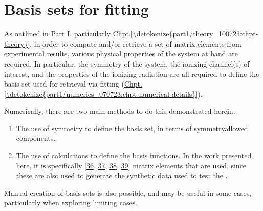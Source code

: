 \documentclass[letterpaper,table,10pt,english]{jupyterBook}
\begin{document}
\sphinxstepscope


\chapter{Basis sets for fitting}
\label{\detokenize{part2/sym-fitting-intro_240723:basis-sets-for-fitting}}\label{\detokenize{part2/sym-fitting-intro_240723:sect-basis-sets-fitting-intro}}\label{\detokenize{part2/sym-fitting-intro_240723::doc}}
\sphinxAtStartPar
As outlined in Part I, particularly \hyperref[\detokenize{part1/theory_100723:chpt-theory}]{Chpt.\@ \ref{\detokenize{part1/theory_100723:chpt-theory}}}, in order to compute and/or retrieve a set of matrix elements from experimental results, various physical properties of the system at hand are required. In particular, the symmetry of the system, the ionizing channel(s) of interest, and the properties of the ionizing radiation are all required to define the basis set used for {\hyperref[\detokenize{backmatter/glossary:term-radial-matrix-elements}]{}} retrieval via fitting (\hyperref[\detokenize{part1/numerics_070723:chpt-numerical-details}]{Chpt.\@ \ref{\detokenize{part1/numerics_070723:chpt-numerical-details}}}).

\sphinxAtStartPar
Numerically, there are two main methods to do this demonstrated herein:
\begin{enumerate}
%
\item {} 
\sphinxAtStartPar
The use of symmetry to define the basis set, in terms of symmetry\sphinxhyphen{}allowed components.

\item {} 
\sphinxAtStartPar
The use of  calculations to define the basis functions. In the work presented here, it is specifically  {[}\hyperlink{cite.backmatter/bibliography:id763}{36}, \hyperlink{cite.backmatter/bibliography:id627}{37}, \hyperlink{cite.backmatter/bibliography:id804}{38}, \hyperlink{cite.backmatter/bibliography:id766}{39}{]} matrix elements that are used, since these are also used to generate the synthetic data used to test the {\hyperref[\detokenize{backmatter/glossary:term-bootstrap-retrieval-protocol}]{}}.

\end{enumerate}

\sphinxAtStartPar
Manual creation of basis sets is also possible, and may be useful in some cases, particularly when exploring limiting cases.
\end{document}
